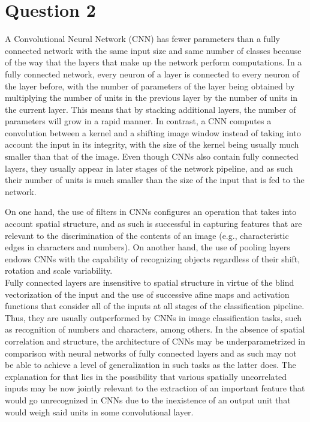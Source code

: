\begin{questions}
    \end{questions}

    \section*{Question 2}

    \begin{questions}
        \question %
            A Convolutional Neural Network (CNN) has fewer parameters than a fully connected network with the same input size and same number of classes because of the way that the layers that make up the network perform computations.
            In a fully connected network, every neuron of a layer is connected to every neuron of the layer before, with the number of parameters of the layer being obtained by multiplying the number of units in the previous layer by the number of units in the current layer. This means that by stacking additional layers, the number of parameters will grow in a rapid manner.
            In contrast, a CNN computes a convolution between a kernel and a shifting image window instead of taking into account the input in its integrity, with the size of the kernel being usually much smaller than that of the image. Even though CNNs also contain fully connected layers, they usually appear in later stages of the network pipeline, and as such their number of units is much smaller than the size of the input that is fed to the network.
            
        \question %
            On one hand, the use of filters in CNNs configures an operation that takes into account spatial structure, and as such is successful in capturing features that are relevant to the discrimination of the contents of an image (e.g., characteristic edges in characters and numbers). On another hand, the use of pooling layers endows CNNs with the capability of recognizing objects regardless of their shift, rotation and scale variability. \\
            Fully connected layers are insensitive to spatial structure in virtue of the blind vectorization of the input and the use of successive afine maps and activation functions that consider all of the inputs at all stages of the classification pipeline. Thus, they are usually outperformed by CNNs in image classification tasks, such as recognition of numbers and characters, among others.
        \question %
            In the absence of spatial correlation and structure, the architecture of CNNs may be underparametrized in comparison with neural networks of fully connected layers and as such may not be able to achieve a level of generalization in such tasks as the latter does. The explanation for that lies in the possibility that various spatially uncorrelated inputs may be now jointly relevant to the extraction of an important feature that would go unrecognized in CNNs due to the inexistence of an output unit that would weigh said units in some convolutional layer.


\end{questions}
